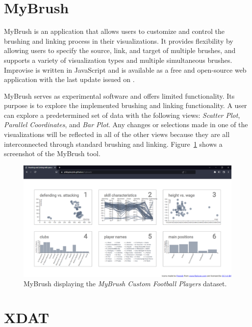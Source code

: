 \section{MyBrush}

MyBrush \parencite{koytek2017mybrush} is an application that allows users
to customize and control the brushing and linking process in their
visualizations. It provides flexibility by allowing users to specify the
source, link, and target of multiple brushes, and supports a variety of
visualization types and multiple simultaneous brushes. Improvise is
written in JavaScript and is available as a free and open-source web
application with the last update issued on .

MyBrush serves as experimental software and offers limited functionality.
Its purpose is to explore the implemented brushing and linking
functionality.  A user can explore a predetermined set of data with the
following views: \emph{Scatter Plot}, \emph{Parallel Coordinates}, and
\emph{Bar Plot}. Any changes or selections made in one of the
visualizations will be reflected in all of the other views because they
are all interconnected through standard brushing and linking.
Figure~\ref{fig:ScreenshotMyBrush} shows a screenshot of the MyBrush tool.




\begin{figure}[tp]
\centering
\includegraphics[keepaspectratio,width=\linewidth,height=\halfh, frame]
{images/screenshot-mybrush.png}

\caption[MyBrush]
{%
MyBrush displaying the \emph{MyBrush Custom Football Players} dataset.
}
\label{fig:ScreenshotMyBrush}
\end{figure}




\section{XDAT}

